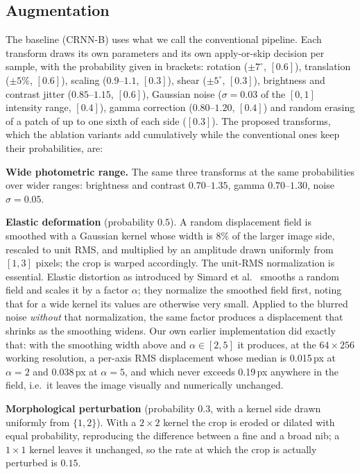 \documentclass{ws-ijprai}
\begin{document}
\subsection{Augmentation}
\label{sec:aug}
The baseline (CRNN-B) uses what we call the conventional pipeline. Each
transform draws its own parameters and its own apply-or-skip decision per
sample, with the probability given in brackets: rotation ($\pm7^\circ$,
$[0.6]$), translation ($\pm5\%$, $[0.6]$), scaling ($0.9$--$1.1$, $[0.3]$),
shear ($\pm5^\circ$, $[0.3]$), brightness and contrast jitter
($0.85$--$1.15$, $[0.6]$), Gaussian noise ($\sigma=0.03$ of the $[0,1]$
intensity range, $[0.4]$), gamma correction ($0.80$--$1.20$, $[0.4]$) and
random erasing of a patch of up to one sixth of each side ($[0.3]$). The
proposed transforms, which the ablation variants add cumulatively while the
conventional ones keep their probabilities, are:

\begin{itemlist}
  \item \textbf{Wide photometric range.} The same three transforms at the
        same probabilities over wider ranges: brightness and contrast
        $0.70$--$1.35$, gamma $0.70$--$1.30$, noise $\sigma=0.05$.
  \item \textbf{Elastic deformation} (probability $0.5$). A random
        displacement field is smoothed with a Gaussian kernel whose
        width is $8\%$ of the larger image side, rescaled to unit RMS,
        and multiplied by an amplitude drawn uniformly from $[1,3]$
        pixels; the crop is warped accordingly. The unit-RMS
        normalization is essential. Elastic distortion as introduced by
        Simard et al.~\cite{simard2003best} smooths a random field and
        scales it by a factor $\alpha$; they normalize the smoothed field
        first, noting that for a wide kernel its values are otherwise very
        small. Applied to the blurred noise \emph{without} that
        normalization, the same factor produces a displacement that shrinks
        as the smoothing widens. Our own earlier implementation did exactly
        that: with the smoothing width above and $\alpha\in[2,5]$ it
        produces, at the $64\times256$ working resolution, a per-axis RMS
        displacement whose median is 0.015\,px at $\alpha=2$ and 0.038\,px
        at $\alpha=5$, and which never exceeds 0.19\,px anywhere in the
        field, i.e.\ it leaves the image visually and numerically
        unchanged.
  \item \textbf{Morphological perturbation} (probability $0.3$, with a
kernel side drawn uniformly from $\{1,2\}$). With a $2\times2$ kernel the
crop is eroded or dilated with equal probability, reproducing the difference
between a fine and a broad nib; a $1\times1$ kernel leaves it unchanged, so
the rate at which the crop is actually perturbed is $0.15$.
\end{itemlist}
\end{document}
